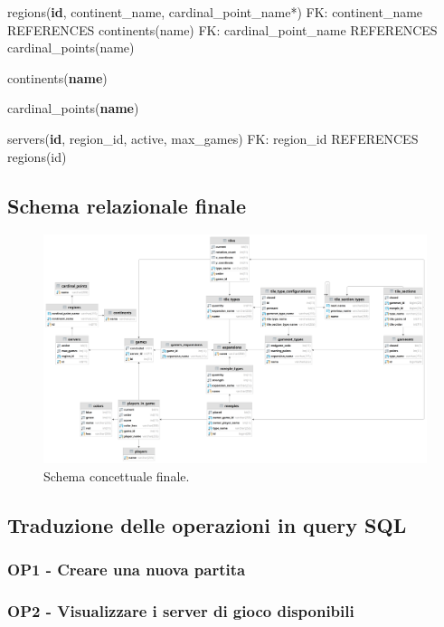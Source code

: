regions(\textbf{id}, continent\_name, cardinal\_point\_name*)\newline
FK: continent\_name REFERENCES continents(name)\newline
FK: cardinal\_point\_name REFERENCES cardinal\_points(name)\newline

continents(\textbf{name})\newline

cardinal\_points(\textbf{name})\newline

servers(\textbf{id}, region\_id, active, max\_games)\newline
FK: region\_id REFERENCES regions(id)

\subsection{Schema relazionale finale}
\begin{figure}[hb]
    \centering\includegraphics[scale=0.06]{images/Progettazione/relazionale.png}
    \caption{Schema concettuale finale.}
\end{figure}

\subsection{Traduzione delle operazioni in query SQL}
\subsubsection*{OP1 - Creare una nuova partita}

\subsubsection*{OP2 - Visualizzare i server di gioco disponibili}


